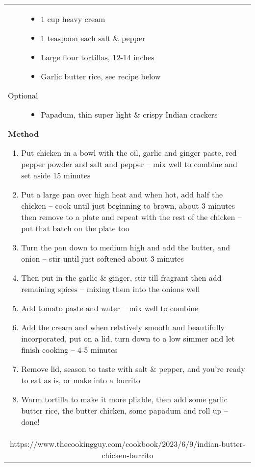 \documentclass[web-recipes.tex]{subfiles}
\begin{document}
\begin{mdframed}[nobreak]
\begin{tabular}{l}
\begin{minipage}[t]{0.35\textwidth}
\begin{description}
\begin{itemize}
          \item 1 cup heavy cream
          \item 1 teaspoon each salt \& pepper
          \item Large flour tortillas, 12-14 inches
          \item Garlic butter rice, see recipe below
        \end{itemize}
      \item[Optional]\hfill
        \begin{itemize}\raggedright\small\sffamily
          \item Papadum, thin super light \& crispy Indian crackers
        \end{itemize}
    \end{description}
  \end{minipage}
  \qquad
  \begin{minipage}[t]{0.55\textwidth}
    {\sffamily\bfseries Method}\vspace{0.5ex}
    \begin{enumerate}\raggedright\small\sffamily
      \item Put chicken in a bowl with the oil, garlic and ginger paste,
        red pepper powder and salt and pepper – mix well to combine and set
        aside 15 minutes
      \item Put a large pan over high heat and when hot, add half the
        chicken – cook until just beginning to brown, about 3 minutes then
        remove to a plate and repeat with the rest of the chicken – put
        that batch on the plate too
      \item Turn the pan down to medium high and add the butter, and
        onion – stir until just softened about 3 minutes
      \item Then put in the garlic \& ginger, stir till fragrant then add
        remaining spices – mixing them into the onions well
      \item Add tomato paste and water – mix well to combine
      \item Add the cream and when relatively smooth and beautifully
        incorporated, put on a lid, turn down to a low simmer and let
        finish cooking – 4-5 minutes
      \item Remove lid, season to taste with salt \& pepper, and you’re
        ready to eat as is, or make into a burrito
      \item Warm tortilla to make it more pliable, then add some garlic
        butter rice, the butter chicken, some papadum and roll up – done!
    \end{enumerate}
  \end{minipage} \vspace{3ex}\\
  \multicolumn{1}{c}{\small\ttfamily https://www.thecookingguy.com/cookbook/2023/6/9/indian-butter-chicken-burrito} \\
\end{tabular}
\end{mdframed}
\end{document}
